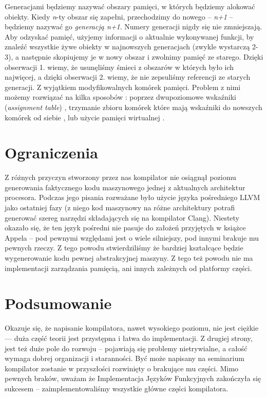 \documentclass[11pt]{scrartcl}
\begin{document}
Generacjami będziemy nazywać obszary pamięci, w których będziemy alokować
obiekty. Kiedy \textit{n}-ty obszar się zapełni, przechodzimy do nowego -- \textit{n+1} -- będziemy
nazywać go \textit{generacją n+1}. Numery generacji nigdy się nie zmniejszają. Aby
odzyskać pamięć, użyjemy informacji o aktualnie wykonywanej funkcji, by znaleźć
wszystkie żywe obiekty w najnowszych generacjach (zwykle wystarczą 2-3), a
następnie skopiujemy je w nowy obszar i zwolnimy pamięć ze starego. Dzięki
obserwacji 1. wiemy, że usunęliśmy śmieci z obszarów w których było ich
najwięcej, a dzięki obserwacji 2. wiemy, że nie zepsuliśmy referencji ze starych
generacji. Z wyjątkiem modyfikowalnych komórek pamięci. Problem z nimi  możemy
rozwiązać na kilka sposobów \cite[Chapter 16.3: Generational garbage
collection]{Appel}: poprzez dwupoziomowe wskaźniki (\textit{assignment
table}) \cite{Lieberman83}, trzymanie zbioru komórek które mają wskaźniki do nowszych komórek od
siebie \cite{Shaw87}, lub użycie pamięci wirtualnej \cite{Ungar86}.


\section{Ograniczenia}
Z różnych przyczyn stworzony przez nas kompilator nie osiągnął poziomu
generowania faktycznego kodu maszynowego jednej z aktualnych architektur
procesora. Podczas jego pisania rozważane było użycie języka pośredniego LLVM
jako ostatniej fazy (z niego kod maszynowy na różne architektury potrafi
generować szereg narzędzi składających się na kompilator Clang). Niestety
okazało się, że ten język pośredni nie pasuje do założeń przyjętych w książce
Appela -- pod pewnymi względami jest o wiele silniejszy, pod innymi brakuje mu
pewnych rzeczy. Z tego powodu stwierdziliśmy że bardziej kształcące będzie
wygenerowanie kodu pewnej abstrakcyjnej maszyny. Z tego też powodu nie ma
implementacji zarządzania pamięcią, ani innych zależnych od platformy części.

\section{Podsumowanie}
Okazuje się, że napisanie kompilatora, nawet wysokiego poziomu, nie jest ciężkie
--- duża część teorii jest przystępna i łatwa do implementacji. Z drugiej strony, jest
też duże pole do rozwoju -- pojawiają się problemy nietrywialne, a całość
wymaga dobrej organizacji i staranności. Być może napisany na seminarium
kompilator zostanie w przyszłości rozwinięty o brakujące mu części. Mimo pewnych
braków, uważam że Implementacja Języków Funkcyjnych zakończyła się sukcesem --
zaimplementowaliśmy wszystkie główne części kompilatora.



\end{document}
